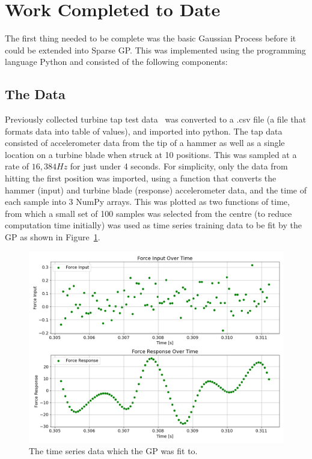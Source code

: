 \documentclass[12pt]{article}
\begin{document}
    \section{Work Completed to Date}
    The first thing needed to be complete was the basic Gaussian Process before it could be extended into Sparse GP\@.
    This was implemented using the programming language Python and consisted of the following components:
    \subsection{The Data}
    Previously collected turbine tap test data~\cite{MEC326} was converted to a .csv file (a file that formats data into table of values), and imported into python.
    The tap data consisted of accelerometer data from the tip of a hammer as well as a single location on a turbine blade when struck at 10 positions.
    This was sampled at a rate of $16,384 Hz$ for just under 4 seconds.
    For simplicity, only the data from hitting the first position was imported, using a function that converts the hammer (input) and turbine blade (response) accelerometer data, and the time of each sample into 3 NumPy arrays.
    This was plotted as two functions of time, from which a small set of 100 samples was selected from the centre (to reduce computation time initially) was used as time series training data to be fit by the GP as shown in Figure~\ref{fig:input-response-plot}.

    \begin{figure}[ht]
        \centering
        \includegraphics[width=1.0\linewidth]{figures/input-response-plot/input-response-plot.png}
        \caption{The time series data which the GP was fit to.}
        \label{fig:input-response-plot}
    \end{figure}
\end{document}
